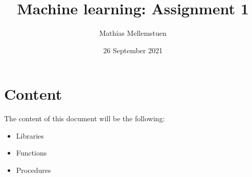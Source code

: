 \documentclass{article}
\title{Machine learning: Assignment 1}
\author{Mathias Mellemstuen}
\date{26 September 2021}
\begin{document}
    \maketitle


    \section{Content}
    The content of this document will be the following: 
    \begin{itemize}
        \item Libraries
        \item Functions
        \item Procedures
    \end{itemize}
\end{document}
